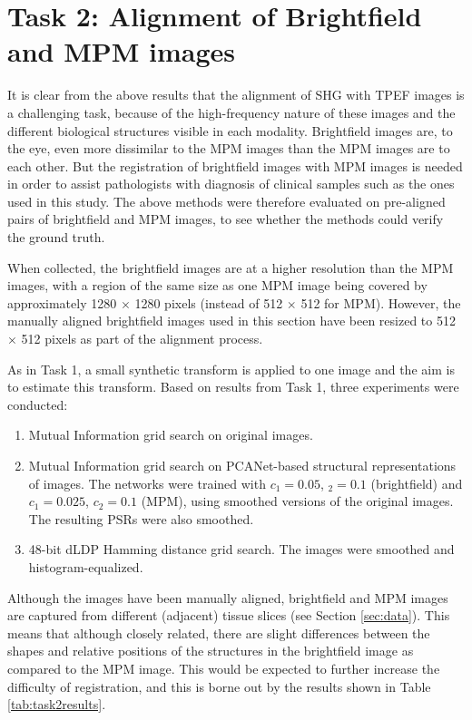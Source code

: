 \documentclass{report}
\begin{document}
\section{Task 2: Alignment of Brightfield and MPM images}
\label{sec:eval_bf_mpm}

It is clear from the above results that the alignment of SHG with TPEF images is a challenging task, because of the high-frequency nature of these images and the different biological structures visible in each modality. Brightfield images are, to the eye, even more dissimilar to the MPM images than the MPM images are to each other. But the registration of brightfield images with MPM images is needed in order to assist pathologists with diagnosis of clinical samples such as the ones used in this study. The above methods were therefore evaluated on pre-aligned pairs of brightfield and MPM images, to see whether the methods could verify the ground truth.

When collected, the brightfield images are at a higher resolution than the MPM images, with a region of the same size as one MPM image being covered by approximately 1280 $\times$ 1280 pixels (instead of 512 $\times$ 512 for MPM). However, the manually aligned brightfield images used in this section have been resized to 512 $\times$ 512 pixels as part of the alignment process.

As in Task 1, a small synthetic transform is applied to one image and the aim is to estimate this transform. Based on results from Task 1, three experiments were conducted:
\begin{enumerate}
    \item Mutual Information grid search on original images.
    \item Mutual Information grid search on PCANet-based structural representations of images. The networks were trained with $c_1=0.05$, $_2=0.1$ (brightfield) and $c_1=0.025$, $c_2=0.1$ (MPM), using smoothed versions of the original images. The resulting PSRs were also smoothed.
    \item 48-bit dLDP Hamming distance grid search. The images were smoothed and histogram-equalized.
\end{enumerate}

Although the images have been manually aligned, brightfield and MPM images are captured from different (adjacent) tissue slices (see Section \ref{sec:data}). This means that although closely related, there are slight differences between the shapes and relative positions of the structures in the brightfield image as compared to the MPM image. This would be expected to further increase the difficulty of registration, and this is borne out by the results shown in Table \ref{tab:task2results}.
\end{document}
